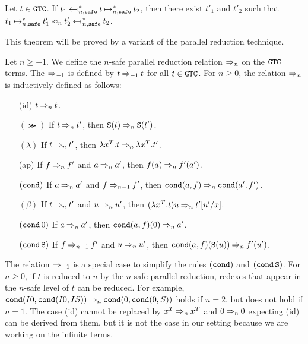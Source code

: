 \begin{theorem}
  Let $t\in {\tt GTC}$.
  If $t_1 \nsafeReducesAstL{n} t \nsafeReducesAst{n} t_2$, 
  then there exist $t'_1$ and $t'_2$ such that
  $t_1 \nsafeReducesAst{n} t'_1 \nequal{n} t'_2 \nsafeReducesAstL{n} t_2$. 
\end{theorem}

This theorem will be proved by a variant of the parallel reduction technique. 

\begin{definition}
  Let $n\ge -1$.
  We define the $n$-safe parallel reduction relation $\mathbin{\Rightarrow_{n}}$ on the ${\tt GTC}$ terms.
  The $\mathbin{\Rightarrow_{-1}}$ is defined by $t\mathbin{\Rightarrow_{-1}} t$ for all $t\in{\tt GTC}$. 
  For $n\ge 0$, the relation $\mathbin{\Rightarrow_{n}}$ is inductively defined as follows: 
  \begin{itemize}
  \item[(id)]
    $t \mathbin{\Rightarrow_{n}} t$.
  \item[$(\Succ)$]
    If $t \mathbin{\Rightarrow_{n}} t'$, then ${\tt S}(t) \mathbin{\Rightarrow_{n}} {\tt S}(t')$.
  \item[$(\lambda)$]
    If $t \mathbin{\Rightarrow_{n}} t'$, then $\lambda x^T.t \mathbin{\Rightarrow_{n}} \lambda x^T.t'$.
  \item[(ap)]
    If $f \mathbin{\Rightarrow_{n}} f'$ and $a \mathbin{\Rightarrow_{n}} a'$,
    then $f(a) \mathbin{\Rightarrow_{n}} f'(a')$.
  \item[$({\tt cond})$]
    If $a \mathbin{\Rightarrow_{n}} a'$ and $f \mathbin{\Rightarrow_{n-1}} f'$,
    then ${\tt cond}(a,f) \mathbin{\Rightarrow_{n}} {\tt cond}(a',f')$.
  \item[$(\beta)$]
    If $t \mathbin{\Rightarrow_{n}} t'$ and $u \mathbin{\Rightarrow_{n}} u'$,
    then $(\lambda x^T.t)u \mathbin{\Rightarrow_{n}} t'[u'/x]$.
  \item[$({\tt cond}\,0)$]
    If $a \mathbin{\Rightarrow_{n}} a'$, 
    then ${\tt cond}(a,f)(0) \mathbin{\Rightarrow_{n}} a'$.
  \item[$({\tt cond}\,{\tt S})$]
    If $f \mathbin{\Rightarrow_{n-1}} f'$ and $u \mathbin{\Rightarrow_{n}} u'$, 
    then ${\tt cond}(a,f)({\tt S}(u)) \mathbin{\Rightarrow_{n}} f'(u')$.
  \end{itemize}
\end{definition}

The relation $\mathbin{\Rightarrow_{-1}}$ is a special case to simplify
the rules $({\tt cond})$ and $({\tt cond}\,{\tt S})$.
For $n\ge 0$, if $t$ is reduced to $u$ by the $n$-safe parallel reduction,
redexes that appear in the $n$-safe level of $t$ can be reduced. 
For example, ${\tt cond}(I0,{\tt cond}(I0,IS)) \mathbin{\Rightarrow_{n}} {\tt cond}(0,{\tt cond}(0,S))$
holds if $n=2$, but does not hold if $n=1$. 
The case (id) cannot be replaced by $x^T \mathbin{\Rightarrow_{n}} x^T$ and $0 \mathbin{\Rightarrow_{n}} 0$ expecting (id) can be derived from them, but it is not the case in our setting
because we are working on the infinite terms. 

